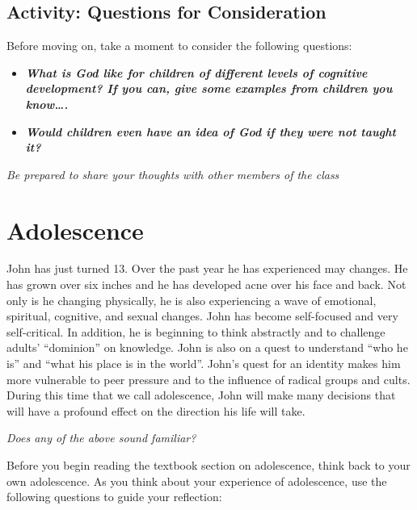 \documentclass[
]{book}
\providecommand{\tightlist}{%
  \setlength{\itemsep}{0pt}\setlength{\parskip}{0pt}}
\begin{document}
\hypertarget{activity-questions-for-consideration-6}{%
\subsection*{Activity: Questions for Consideration}\label{activity-questions-for-consideration-6}}

\begin{reflect}
Before moving on, take a moment to consider the following questions:

\begin{itemize}
\tightlist
\item
  \textbf{\emph{What is God like for children of different levels of cognitive development? If you can, give some examples from children you know\ldots.}}\\
\item
  \textbf{\emph{Would children even have an idea of God if they were not taught it?}}
\end{itemize}

\emph{Be prepared to share your thoughts with other members of the class}
\end{reflect}

\hypertarget{adolescence}{%
\section{Adolescence}\label{adolescence}}

John has just turned 13. Over the past year he has experienced may changes. He has grown over six inches and he has developed acne over his face and back. Not only is he changing physically, he is also experiencing a wave of emotional, spiritual, cognitive, and sexual changes. John has become self-focused and very self-critical. In addition, he is beginning to think abstractly and to challenge adults' ``dominion'' on knowledge. John is also on a quest to understand ``who he is'' and ``what his place is in the world''. John's quest for an identity makes him more vulnerable to peer pressure and to the influence of radical groups and cults. During this time that we call adolescence, John will make many decisions that will have a profound effect on the direction his life will take.

\emph{Does any of the above sound familiar?}

Before you begin reading the textbook section on adolescence, think back to your own adolescence. As you think about your experience of adolescence, use the following questions to guide your reflection:
\end{document}

